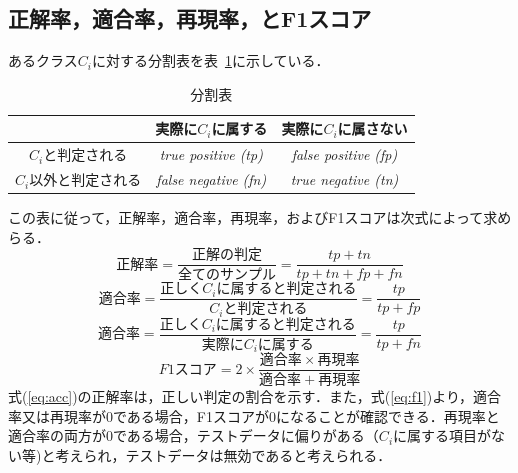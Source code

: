 \documentclass[12pt]{jarticle}
\newcommand\doubleRule{\toprule\toprule}
\begin{document}
\begin{appendices}
\section{正解率，適合率，再現率，とF1スコア} \label{appendix:MLeval}
あるクラス$C_i$に対する分割表を表~\ref{table:confmat}に示している．

\begin{table}[thb!]
\centering
\caption{分割表}
\label{table:confmat}
\begin{tabular}[t]{c|cc}
\doubleRule
& 実際に$C_i$に属する & 実際に$C_i$に属さない \\
\hline
$C_i$と判定される & \textit{true positive (tp)} & \textit{false positive (fp)} \\
$C_i$以外と判定される & \textit{false negative (fn)} & \textit{true negative (tn)} \\
\bottomrule
\end{tabular}
\end{table}

この表に従って，正解率，適合率，再現率，およびF1スコアは次式によって求めらる．
\begin{equation} \label{eq:acc}正解率=\frac{正解の判定}{全てのサンプル}=\frac{tp+tn}{tp+tn+fp+fn} \end{equation}
\begin{equation}適合率=\frac{正しくC_iに属すると判定される}{C_iと判定される}=\frac{tp}{tp+fp} \end{equation}
\begin{equation}適合率=\frac{正しくC_iに属すると判定される}{実際にC_iに属する}=\frac{tp}{tp+fn} \end{equation}
\begin{equation}\label{eq:f1}F1スコア=2\times\frac{適合率\times{再現率}}{適合率+再現率} \end{equation}
式(\ref{eq:acc})の正解率は，正しい判定の割合を示す．また，式(\ref{eq:f1})より，適合率又は再現率が0である場合，F1スコアが0になることが確認できる．再現率と適合率の両方が0である場合，テストデータに偏りがある（$C_i$に属する項目がない等)と考えられ，テストデータは無効であると考えられる．

\end{appendices}
\end{document}
